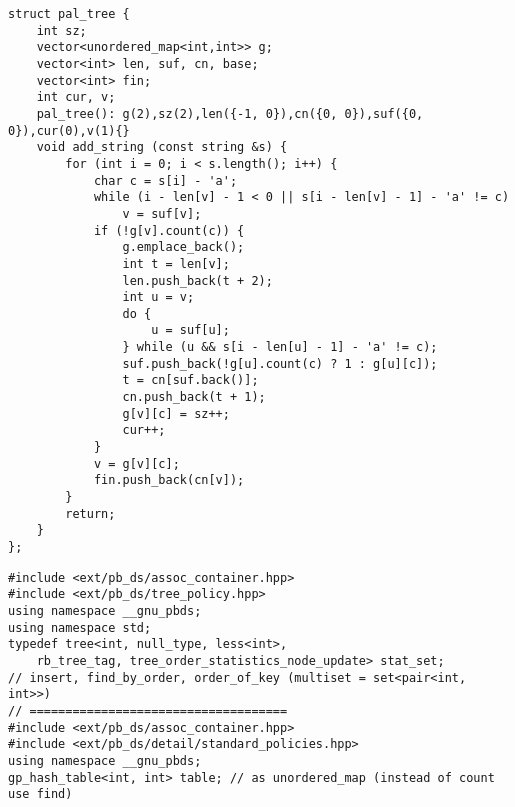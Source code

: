 \documentclass[12pt]{article}
\begin{document}
\begin{verbatim}
struct pal_tree {
    int sz;
    vector<unordered_map<int,int>> g;
    vector<int> len, suf, cn, base;
    vector<int> fin;
    int cur, v;
    pal_tree(): g(2),sz(2),len({-1, 0}),cn({0, 0}),suf({0, 0}),cur(0),v(1){}
    void add_string (const string &s) {
        for (int i = 0; i < s.length(); i++) {
            char c = s[i] - 'a';
            while (i - len[v] - 1 < 0 || s[i - len[v] - 1] - 'a' != c)
                v = suf[v];
            if (!g[v].count(c)) {
                g.emplace_back();
                int t = len[v];
                len.push_back(t + 2);
                int u = v;
                do {
                    u = suf[u];
                } while (u && s[i - len[u] - 1] - 'a' != c);
                suf.push_back(!g[u].count(c) ? 1 : g[u][c]);
                t = cn[suf.back()];
                cn.push_back(t + 1);
                g[v][c] = sz++;
                cur++;
            }
            v = g[v][c];
            fin.push_back(cn[v]);
        }
        return;
    }
};
\end{verbatim}

\begin{verbatim}
#include <ext/pb_ds/assoc_container.hpp>
#include <ext/pb_ds/tree_policy.hpp>
using namespace __gnu_pbds;
using namespace std;
typedef tree<int, null_type, less<int>, 
    rb_tree_tag, tree_order_statistics_node_update> stat_set;
// insert, find_by_order, order_of_key (multiset = set<pair<int, int>>)
// ====================================
#include <ext/pb_ds/assoc_container.hpp>
#include <ext/pb_ds/detail/standard_policies.hpp>
using namespace __gnu_pbds;
gp_hash_table<int, int> table; // as unordered_map (instead of count use find)
\end{verbatim}
\end{document}
